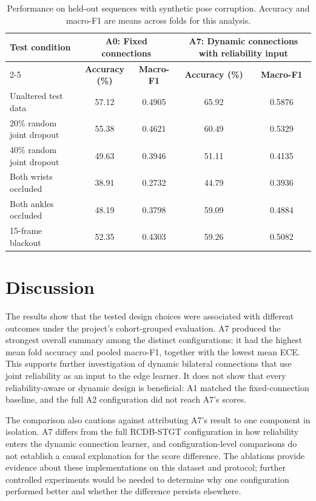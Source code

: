 \begin{table}[htbp]
\centering
\caption{Performance on held-out sequences with synthetic pose corruption. Accuracy and macro-F1 are means across folds for this analysis.}
\label{tab:rcdb_corruption}
\small
\begin{tabular}{|l|cc|cc|}
\hline
\textbf{Test condition} & \multicolumn{2}{c|}{\textbf{A0: Fixed connections}} & \multicolumn{2}{c|}{\textbf{A7: Dynamic connections with reliability input}} \\
\cline{2-5}
 & \textbf{Accuracy (\%)} & \textbf{Macro-F1} & \textbf{Accuracy (\%)} & \textbf{Macro-F1} \\
\hline
Unaltered test data & 57.12 & 0.4905 & 65.92 & 0.5876 \\
\hline
20\% random joint dropout & 55.38 & 0.4621 & 60.49 & 0.5329 \\
\hline
40\% random joint dropout & 49.63 & 0.3946 & 51.11 & 0.4135 \\
\hline
Both wrists occluded & 38.91 & 0.2732 & 44.79 & 0.3936 \\
\hline
Both ankles occluded & 48.19 & 0.3798 & 59.09 & 0.4884 \\
\hline
15-frame blackout & 52.35 & 0.4303 & 59.26 & 0.5082 \\
\hline
\end{tabular}
\end{table}

\section{Discussion}\label{sec:discussion}

The results show that the tested design choices were associated with different outcomes under the project's cohort-grouped evaluation. A7 produced the strongest overall summary among the distinct configurations: it had the highest mean fold accuracy and pooled macro-F1, together with the lowest mean ECE. This supports further investigation of dynamic bilateral connections that use joint reliability as an input to the edge learner. It does not show that every reliability-aware or dynamic design is beneficial: A1 matched the fixed-connection baseline, and the full A2 configuration did not reach A7's scores.

The comparison also cautions against attributing A7's result to one component in isolation. A7 differs from the full RCDB-STGT configuration in how reliability enters the dynamic connection learner, and configuration-level comparisons do not establish a causal explanation for the score difference. The ablations provide evidence about these implementations on this dataset and protocol; further controlled experiments would be needed to determine why one configuration performed better and whether the difference persists elsewhere.

